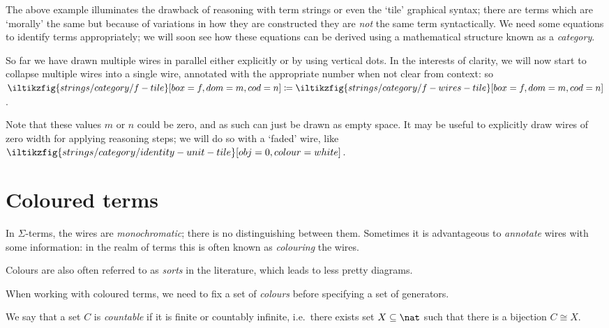 The above example illuminates the drawback of reasoning with term strings or
even the `tile' graphical syntax; there are terms which are `morally' the same
but because of variations in how they are constructed they are \emph{not} the
same term syntactically.
We need some equations to identify terms appropriately; we will soon see how
these equations can be derived using a mathematical structure known as a
\emph{category}.

\begin{notation}\label{not:arbitrary-width-wires}
    So far we have drawn multiple wires in parallel either explicitly or
    by using vertical dots.
    In the interests of clarity, we will now start to collapse multiple wires
    into a single wire, annotated with the appropriate number when not clear
    from context: so \(
    \iltikzfig{strings/category/f-tile}[box=f,dom=m,cod=n]
    \coloneqq
    \iltikzfig{strings/category/f-wires-tile}[box=f,dom=m,cod=n]
    \).

    Note that these values \(m\) or \(n\) could be zero, and as such can just be
    drawn as empty space.
    It may be useful to explicitly draw wires of zero width for applying
    reasoning steps; we will do so with a `faded' wire, like \(
    \iltikzfig{strings/category/identity-unit-tile}[obj=0,colour=white]
    \).
\end{notation}

\section{Coloured terms}

In \(\Sigma\)-terms, the wires are \emph{monochromatic}; there is no
distinguishing between them.
Sometimes it is advantageous to \emph{annotate} wires with some information: in
the realm of terms this is often known as \emph{colouring} the wires.

\begin{remark}
    Colours are also often referred to as \emph{sorts} in the literature, which
    leads to less pretty diagrams.
\end{remark}

When working with coloured terms, we need to fix a set of \emph{colours} before
specifying a set of generators.

\begin{notation}
    We say that a set \(C\) is \emph{countable} if it is finite or countably
    infinite, i.e.\ there exists set \(X \subseteq \nat\) such that there is a
    bijection \(C \cong X\).
\end{notation}

